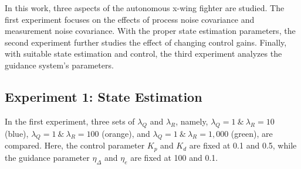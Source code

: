 In this work, three aspects of the autonomous x-wing fighter are studied. The first experiment focuses on the effects of process noise covariance and measurement noise covariance. With the proper state estimation parameters, the second experiment further studies the effect of changing control gains. Finally, with suitable state estimation and control, the third experiment analyzes the guidance system's parameters.


\subsection{Experiment 1: State Estimation}
 \label{sec:exp_navigation}
 In the first experiment, three sets of $\lambda_Q$ and $\lambda_R$, namely, $\lambda_Q=1\:\&\:\lambda_R=10$ (blue), $\lambda_Q=1\:\&\:\lambda_R=100$ (orange), and $\lambda_Q=1\:\&\:\lambda_R=1,000$ (green), are compared. Here, the control parameter $K_p$ and $K_d$ are fixed at 0.1 and 0.5, while the guidance parameter $\eta_\Delta$ and $\eta_e$ are fixed at 100 and 0.1.

